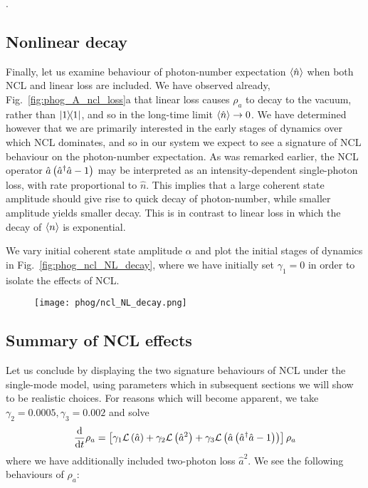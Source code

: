 .

\subsection{Nonlinear decay}

Finally, let us examine behaviour of photon-number expectation $\ev{\hat{n}}$ when both NCL and linear loss are included. We have observed already, Fig.~\ref{fig:phog_A_ncl_loss}a that linear loss causes $\rho_a$ to decay to the vacuum, rather than $\dyad{1}$, and so in the long-time limit $\ev{\hat{n}} \rightarrow 0$. We have determined however that we are primarily interested in the early stages of dynamics over which NCL dominates, and so in our system we expect to see a signature of NCL behaviour on the photon-number expectation. As was remarked earlier, the NCL operator $\hat{a}\left(\hat{a}^\dagger \hat{a} - 1\right)$ may be interpreted as an intensity-dependent single-photon loss, with rate proportional to $\hat{n}$. This implies that a large coherent state amplitude should give rise to quick decay of photon-number, while smaller amplitude yields smaller decay. This is in contrast to linear loss in which the decay of $\ev{n}$ is exponential. 

We vary initial coherent state amplitude $\alpha$ and plot the initial stages of dynamics in Fig.~\ref{fig:phog_ncl_NL_decay}, where we have initially set $\gamma_1=0$ in order to isolate the effects of NCL. 

\begin{figure}[htp]
\centering
\texttt{[image: phog/ncl\_NL\_decay.png]}
\end{figure}


\subsection{Summary of NCL effects}\label{sec:phog_summary_ncl_effects}
Let us conclude by displaying the two signature behaviours of NCL under the single-mode model, using parameters which in subsequent sections we will show to be realistic choices. For reasons which will become apparent, we take $\gamma_2 = 0.0005, \gamma_3 = 0.002$ and solve
\begin{equation}\label{eqn:phog_full_single_mode}
\frac{\mathrm{d}}{\mathrm{d}t} \rho_a = \left[\gamma_1 \mathcal{L}\left(\hat{a}\right) + \gamma_2 \mathcal{L}\left(\hat{a}^2\right) + \gamma_3 \mathcal{L}\left(\hat{a}\left(\hat{a}^\dagger \hat{a} - 1\right)\right) \right] \rho_a
\end{equation}
where we have additionally included two-photon loss $\hat{a}^2$. We see the following behaviours of $\rho_a$:

